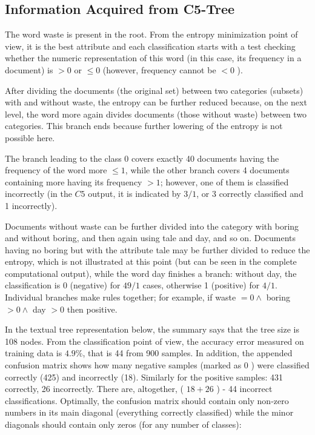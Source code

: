 \subsection{Information Acquired from C5-Tree}
The word waste is present in the root. From the entropy minimization point of view, it is the best attribute and each classification starts with a test checking whether the numeric representation of this word (in this case, its frequency in a document) is $>0$ or $\leq 0$ (however, frequency cannot be $<0$ ).

After dividing the documents (the original set) between two categories (subsets) with and without waste, the entropy can be further reduced because, on the next level, the word more again divides documents (those without waste) between two categories. This branch ends because further lowering of the entropy is not possible here.

The branch leading to the class 0 covers exactly 40 documents having the frequency of the word more $\leq 1$, while the other branch covers 4 documents containing more having its frequency $>1$; however, one of them is classified incorrectly (in the $C 5$ output, it is indicated by $3 / 1$, or 3 correctly classified and 1 incorrectly).

Documents without waste can be further divided into the category with boring and without boring, and then again using tale and day, and so on. Documents having no boring but with the attribute tale may be further divided to reduce the entropy, which is not illustrated at this point (but can be seen in the complete computational output), while the word day finishes a branch: without day, the classification is 0 (negative) for $49 / 1$ cases, otherwise 1 (positive) for $4 / 1$. Individual branches make rules together; for example, if waste $=0 \wedge$ boring $> 0 \wedge$ day $>0$ then positive.

In the textual tree representation below, the summary says that the tree size is 108 nodes. From the classification point of view, the accuracy error measured on training data is $4.9 \%$, that is 44 from 900 samples. In addition, the appended confusion matrix shows how many negative samples (marked as 0 ) were classified correctly (425) and incorrectly (18). Similarly for the positive samples: 431 correctly, 26 incorrectly. There are, altogether, ( $18+26$ ) - 44 incorrect classifications. Optimally, the confusion matrix should contain only non-zero numbers in its main diagonal (everything correctly classified) while the minor diagonals should contain only zeros (for any number of classes):

